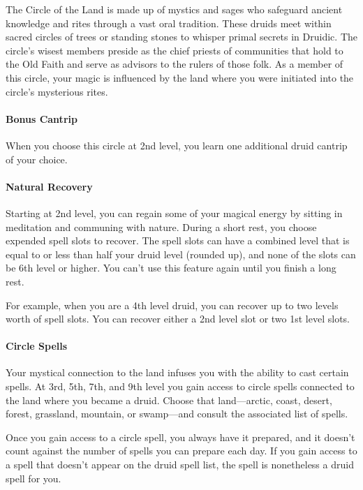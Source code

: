 \documentclass[
]{article}
\begin{document}
The Circle of the Land is made up of mystics and sages who safeguard
ancient knowledge and rites through a vast oral tradition. These druids
meet within sacred circles of trees or standing stones to whisper primal
secrets in Druidic. The circle's wisest members preside as the chief
priests of communities that hold to the Old Faith and serve as advisors
to the rulers of those folk. As a member of this circle, your magic is
influenced by the land where you were initiated into the circle's
mysterious rites.

\hypertarget{bonus-cantrip}{%
\paragraph{Bonus Cantrip}\label{bonus-cantrip}}

When you choose this circle at 2nd level, you learn one additional druid
cantrip of your choice.

\hypertarget{natural-recovery}{%
\paragraph{Natural Recovery}\label{natural-recovery}}

Starting at 2nd level, you can regain some of your magical energy by
sitting in meditation and communing with nature. During a short rest,
you choose expended spell slots to recover. The spell slots can have a
combined level that is equal to or less than half your druid level
(rounded up), and none of the slots can be 6th level or higher. You
can't use this feature again until you finish a long rest.

For example, when you are a 4th level druid, you can recover up to two
levels worth of spell slots. You can recover either a 2nd level slot or
two 1st level slots.

\hypertarget{circle-spells}{%
\paragraph{Circle Spells}\label{circle-spells}}

Your mystical connection to the land infuses you with the ability to
cast certain spells. At 3rd, 5th, 7th, and 9th level you gain access to
circle spells connected to the land where you became a druid. Choose
that land---arctic, coast, desert, forest, grassland, mountain, or
swamp---and consult the associated list of spells.

Once you gain access to a circle spell, you always have it prepared, and
it doesn't count against the number of spells you can prepare each day.
If you gain access to a spell that doesn't appear on the druid spell
list, the spell is nonetheless a druid spell for you.
\end{document}
